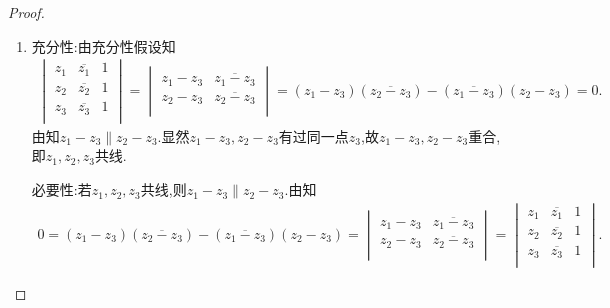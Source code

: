 \documentclass[../../main.tex]{subfiles}%
\begin{document}
\begin{proof}
\begin{enumerate}[(1)]
\item {\heiti 充分性:}由充分性假设知
\begin{align*}
\begin{vmatrix}
z_1& \overline{z_1}& 1\\
z_2& \overline{z_2}& 1\\
z_3& \overline{z_3}& 1\\
\end{vmatrix}
=
\begin{vmatrix}
z_1-z_3& \overline{z_1-z_3}\\
z_2-z_3& \overline{z_2-z_3}\\
\end{vmatrix}
= \left( z_1-z_3 \right) \left( \overline{z_2-z_3} \right) -\left( \overline{z_1-z_3} \right) \left( z_2-z_3 \right) =0.
\end{align*}
由知$z_1-z_3\parallel z_2-z_3$.显然$z_1-z_3,z_2-z_3$有过同一点$z_3$,故$z_1-z_3,z_2-z_3$重合,即$z_1,z_2,z_3$共线.

{\heiti 必要性:}若$z_1,z_2,z_3$共线,则$z_1-z_3\parallel z_2-z_3$.由知
\begin{align*}
0=\left( z_1-z_3 \right) \left( \overline{z_2-z_3} \right) -\left( \overline{z_1-z_3} \right) \left( z_2-z_3 \right) =
\begin{vmatrix}
z_1-z_3& \overline{z_1-z_3}\\
z_2-z_3& \overline{z_2-z_3}\\
\end{vmatrix}
=
\begin{vmatrix}
z_1& \overline{z_1}& 1\\
z_2& \overline{z_2}& 1\\
z_3& \overline{z_3}& 1\\
\end{vmatrix}.
\end{align*}


\end{enumerate}
\end{proof}
\end{document}
